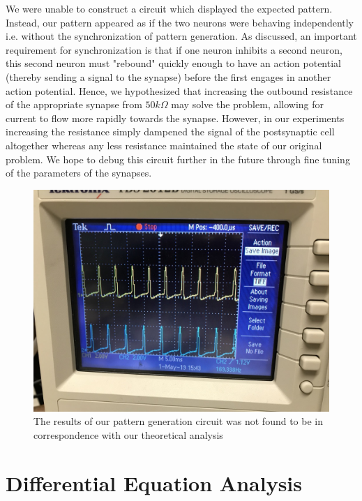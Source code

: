 \documentclass[12]{book}
\newcommand\0{\mathbf{0}}
\newcommand\<{\langle}
\renewcommand\>{\rangle}
\begin{document}
We were unable to construct a circuit which displayed the expected pattern. Instead, our pattern appeared as if the two neurons were behaving independently i.e. without the synchronization of pattern generation. As discussed, an important requirement for synchronization is that if one neuron inhibits a second neuron, this second neuron must "rebound" quickly enough to have an action potential (thereby sending a signal to the synapse) before the first engages in another action potential. Hence, we hypothesized that increasing the outbound resistance of the appropriate synapse from $50k\Omega$ may solve the problem, allowing for current to flow more rapidly towards the synapse. However, in our experiments increasing the resistance simply dampened the signal of the postsynaptic cell altogether whereas any less resistance maintained the state of our original problem. We hope to debug this circuit further in the future through fine tuning of the parameters of the synapses.

\begin{figure}[h]
\centering
\includegraphics{pattern_generation}
\caption{The results of our pattern generation circuit was not found to be in correspondence with our theoretical analysis}
\end{figure}


\appendix

\chapter{Differential Equation Analysis}
\end{document}
